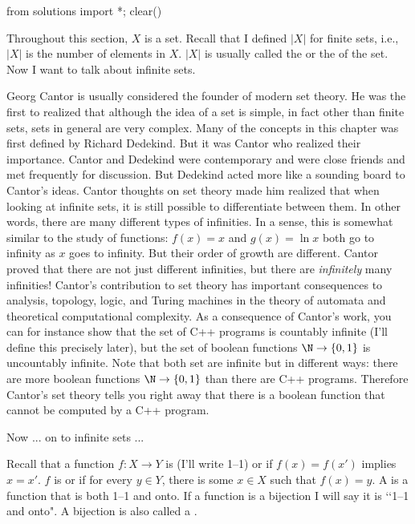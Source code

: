  \label{S:countability}
\begin{python0}
from solutions import *; clear()
\end{python0}

Throughout this section, $X$ is a set. Recall that I defined
$|X|$ for finite sets, i.e., $|X|$ is the number of elements in $X$.
$|X|$ is usually called the
or the
\sidebarskip{12pt}\sidebarskip{0pt}
of the set.
Now I want to talk about infinite sets.

Georg Cantor is usually considered the founder of modern
set theory.
He was the first to realized that although
the idea of a set is simple, in fact other than finite sets,
sets in general are very complex.
Many of the concepts in this chapter was first defined
by
Richard Dedekind.
But it was Cantor who realized their importance.
Cantor and Dedekind were contemporary and were close friends
and met frequently for discussion.
But Dedekind acted more like a sounding board to Cantor's ideas.
Cantor thoughts on set theory made him realized that
when looking at infinite sets, it is
still possible to differentiate between them.
In other words, there are many different types of infinities.
In a sense, this is somewhat similar to the study of functions:
$f(x) = x$ and $g(x) = \ln x$ both go to infinity as $x$ goes to
infinity. But their order of growth are different.
Cantor proved that there are not just different infinities,
but there are \textit{infinitely} many infinities!
Cantor's contribution to set theory has important
consequences to analysis, topology, logic, and
Turing machines in the theory of automata and
theoretical computational complexity.
As a consequence of Cantor's work, you can for instance show that
the set of C++ programs is countably infinite (I'll
define this precisely later), but the set of
boolean functions $\N \rightarrow \{0, 1\}$ is uncountably
infinite. Note that both set are infinite but in different ways:
there are more boolean functions $\N \rightarrow \{0, 1\}$
than there are C++ programs.
Therefore Cantor's set theory tells you right away that
there is a boolean function that cannot be computed by a C++
program.

Now ... on to infinite sets ...

Recall that a function $f: X \rightarrow Y$
is
(I'll write 1--1) or
\sidebarskip{0pt}\sidebarskip{0pt}
if
$f(x) = f(x')$ implies $x = x'$.
$f$ is
\sidebarskip{12pt}\sidebarskip{0pt} or
\sidebarskip{24pt}\sidebarskip{0pt}
if for every $y \in Y$, there is some $x \in X$ such that
$f(x) = y$.
A
\sidebarskip{12pt} %
is a function that is both 1--1 and onto.
If a function is a bijection I will say it is \lq\lq 1--1 and onto".
A bijection is also called a
\sidebarskip{1pt}.

